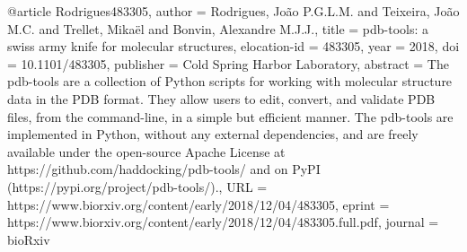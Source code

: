@article {Rodrigues483305,
  author = {Rodrigues, Jo{\~a}o P.G.L.M. and Teixeira, Jo{\~a}o M.C. and Trellet, Mika{\"e}l and Bonvin, Alexandre M.J.J.},
  title = {pdb-tools: a swiss army knife for molecular structures},
  elocation-id = {483305},
  year = {2018},
  doi = {10.1101/483305},
  publisher = {Cold Spring Harbor Laboratory},
  abstract = {The pdb-tools are a collection of Python scripts for working with molecular structure data in the PDB format. They allow users to edit, convert, and validate PDB files, from the command-line, in a simple but efficient manner. The pdb-tools are implemented in Python, without any external dependencies, and are freely available under the open-source Apache License at https://github.com/haddocking/pdb-tools/ and on PyPI (https://pypi.org/project/pdb-tools/).},
  URL = {https://www.biorxiv.org/content/early/2018/12/04/483305},
  eprint = {https://www.biorxiv.org/content/early/2018/12/04/483305.full.pdf},
  journal = {bioRxiv}
}